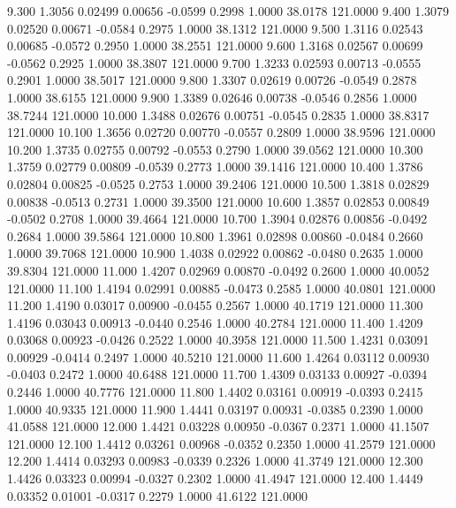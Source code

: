    9.300   1.3056   0.02499   0.00656  -0.0599   0.2998   1.0000  38.0178 121.0000
   9.400   1.3079   0.02520   0.00671  -0.0584   0.2975   1.0000  38.1312 121.0000
   9.500   1.3116   0.02543   0.00685  -0.0572   0.2950   1.0000  38.2551 121.0000
   9.600   1.3168   0.02567   0.00699  -0.0562   0.2925   1.0000  38.3807 121.0000
   9.700   1.3233   0.02593   0.00713  -0.0555   0.2901   1.0000  38.5017 121.0000
   9.800   1.3307   0.02619   0.00726  -0.0549   0.2878   1.0000  38.6155 121.0000
   9.900   1.3389   0.02646   0.00738  -0.0546   0.2856   1.0000  38.7244 121.0000
  10.000   1.3488   0.02676   0.00751  -0.0545   0.2835   1.0000  38.8317 121.0000
  10.100   1.3656   0.02720   0.00770  -0.0557   0.2809   1.0000  38.9596 121.0000
  10.200   1.3735   0.02755   0.00792  -0.0553   0.2790   1.0000  39.0562 121.0000
  10.300   1.3759   0.02779   0.00809  -0.0539   0.2773   1.0000  39.1416 121.0000
  10.400   1.3786   0.02804   0.00825  -0.0525   0.2753   1.0000  39.2406 121.0000
  10.500   1.3818   0.02829   0.00838  -0.0513   0.2731   1.0000  39.3500 121.0000
  10.600   1.3857   0.02853   0.00849  -0.0502   0.2708   1.0000  39.4664 121.0000
  10.700   1.3904   0.02876   0.00856  -0.0492   0.2684   1.0000  39.5864 121.0000
  10.800   1.3961   0.02898   0.00860  -0.0484   0.2660   1.0000  39.7068 121.0000
  10.900   1.4038   0.02922   0.00862  -0.0480   0.2635   1.0000  39.8304 121.0000
  11.000   1.4207   0.02969   0.00870  -0.0492   0.2600   1.0000  40.0052 121.0000
  11.100   1.4194   0.02991   0.00885  -0.0473   0.2585   1.0000  40.0801 121.0000
  11.200   1.4190   0.03017   0.00900  -0.0455   0.2567   1.0000  40.1719 121.0000
  11.300   1.4196   0.03043   0.00913  -0.0440   0.2546   1.0000  40.2784 121.0000
  11.400   1.4209   0.03068   0.00923  -0.0426   0.2522   1.0000  40.3958 121.0000
  11.500   1.4231   0.03091   0.00929  -0.0414   0.2497   1.0000  40.5210 121.0000
  11.600   1.4264   0.03112   0.00930  -0.0403   0.2472   1.0000  40.6488 121.0000
  11.700   1.4309   0.03133   0.00927  -0.0394   0.2446   1.0000  40.7776 121.0000
  11.800   1.4402   0.03161   0.00919  -0.0393   0.2415   1.0000  40.9335 121.0000
  11.900   1.4441   0.03197   0.00931  -0.0385   0.2390   1.0000  41.0588 121.0000
  12.000   1.4421   0.03228   0.00950  -0.0367   0.2371   1.0000  41.1507 121.0000
  12.100   1.4412   0.03261   0.00968  -0.0352   0.2350   1.0000  41.2579 121.0000
  12.200   1.4414   0.03293   0.00983  -0.0339   0.2326   1.0000  41.3749 121.0000
  12.300   1.4426   0.03323   0.00994  -0.0327   0.2302   1.0000  41.4947 121.0000
  12.400   1.4449   0.03352   0.01001  -0.0317   0.2279   1.0000  41.6122 121.0000
